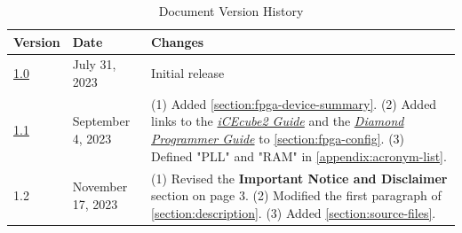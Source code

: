 \begin{table}[h]
    \begin{tabularx}{\textwidth}{| >{\hsize=0.1\hsize}X | >{\hsize=0.2\hsize}X | >{\hsize=0.7\hsize}X |}
        \hline
        \rowcolor{lightgray!50} 
        \textbf{Version} &
        \textbf{Date} &
        \textbf{Changes} \\
        \hline

        \href{https://www.thetamachines.com/downloads/hardware/eth4k-data-sheet-v1.0.pdf}{1.0} & July 31, 2023 & Initial release \\
        \hline

        \href{https://www.thetamachines.com/downloads/hardware/eth4k-data-sheet-v1.1.pdf}{1.1} & September 4, 2023 & 
        (1) Added \autoref{section:fpga-device-summary}. \newline 
        (2) Added links to the \href{https://docs.thetamachines.com/hardware/disco-boards/eth4k/icecube2-guide}{\textit{iCEcube2 Guide}} and the \href{https://docs.thetamachines.com/hardware/disco-boards/eth4k/diamond-programmer-guide}{\textit{Diamond Programmer Guide}} to \autoref{section:fpga-config}. \newline
        (3) Defined "PLL" and "RAM" in \textcolor{red}{\autoref{appendix:acronym-list}}. \\
        \hline

        1.2 & November 17, 2023 &
        (1) Revised the \textbf{Important Notice and Disclaimer} section on page 3. \newline
        (2) Modified the first paragraph of \autoref{section:description}. \newline
        (3) Added \autoref{section:source-files}. \\
        \hline
    \end{tabularx}
    \caption{Document Version History}
\end{table}
